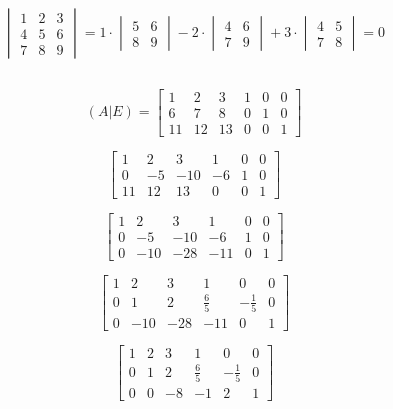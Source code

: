 \documentclass[a4paper, 14pt]{article}
\begin{document}
\subsection{}
\[
    \begin{vmatrix}
        1&2&3 \\ 4&5&6 \\ 7&8&9
    \end{vmatrix}
    =1 \cdot
    \begin{vmatrix}
        5&6 \\ 8&9
    \end{vmatrix}
    -2 \cdot
    \begin{vmatrix}
        4&6 \\ 7&9
    \end{vmatrix}
    +3 \cdot
    \begin{vmatrix}
        4&5 \\ 7&8
    \end{vmatrix}
    =0
\]
\subsection{}

\[
(A | E) = \begin{bmatrix}
1 & 2 & 3 & 1 & 0 & 0 \\
6 & 7 & 8 & 0 & 1 & 0 \\
11 & 12 & 13 & 0 & 0 & 1
\end{bmatrix}
\]

\[
\begin{bmatrix}
1 & 2 & 3 & 1 & 0 & 0 \\
0 & -5 & -10 & -6 & 1 & 0 \\
11 & 12 & 13 & 0 & 0 & 1
\end{bmatrix}
\]

\[
\begin{bmatrix}
1 & 2 & 3 & 1 & 0 & 0 \\
0 & -5 & -10 & -6 & 1 & 0 \\
0 & -10 & -28 & -11 & 0 & 1
\end{bmatrix}
\]

\[
\begin{bmatrix}
1 & 2 & 3 & 1 & 0 & 0 \\
0 & 1 & 2 & \frac{6}{5} & -\frac{1}{5} & 0 \\
0 & -10 & -28 & -11 & 0 & 1
\end{bmatrix}
\]

\[
\begin{bmatrix}
1 & 2 & 3 & 1 & 0 & 0 \\
0 & 1 & 2 & \frac{6}{5} & -\frac{1}{5} & 0 \\
0 & 0 & -8 & -1 & 2 & 1
\end{bmatrix}
\]
\end{document}
